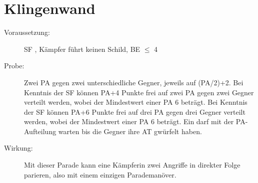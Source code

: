 \section{Klingenwand}
\label{reaktion.klingenwand}
\begin{description}
    \item[Voraussetzung:] SF , Kämpfer führt keinen Schild, BE\textrm{ ${\leq}$ }4
    \item[Probe:]
        Zwei PA gegen zwei unterschiedliche Gegner, jeweils auf (PA/2)+2.\newline
        Bei Kenntnis der SF  können PA+4 Punkte frei auf zwei PA gegen zwei Gegner verteilt werden, wobei der Mindestwert einer PA 6 beträgt.\newline
        Bei Kenntnis der SF  können PA+6 Punkte frei auf drei PA gegen drei Gegner verteilt werden, wobei der Mindestwert einer PA 6 beträgt.\newline
        Ein  darf mit der PA-Aufteilung warten bis die Gegner ihre AT gwürfelt haben.
    \item[Wirkung:]
        Mit dieser Parade kann eine Kämpferin zwei Angriffe in direkter Folge parieren, also mit einem einzigen Parademanöver.
\end{description}
